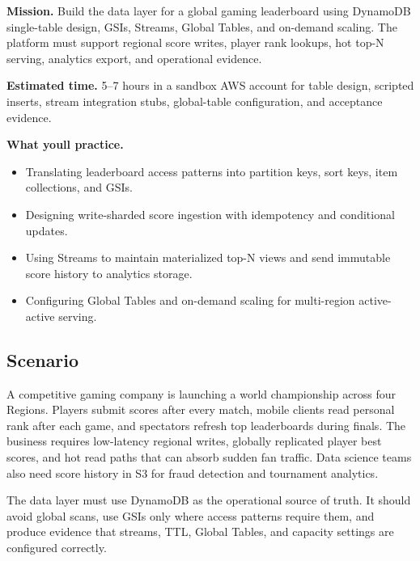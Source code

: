 \begin{capstonebox}
\textbf{Mission.} Build the data layer for a global gaming leaderboard using DynamoDB single-table design, GSIs, Streams, Global Tables, and on-demand scaling. The platform must support regional score writes, player rank lookups, hot top-N serving, analytics export, and operational evidence.

\textbf{Estimated time.} 5--7 hours in a sandbox AWS account for table design, scripted inserts, stream integration stubs, global-table configuration, and acceptance evidence.

\textbf{What you\textquotesingle{}ll practice.}
\begin{itemize}
    \item Translating leaderboard access patterns into partition keys, sort keys, item collections, and GSIs.
    \item Designing write-sharded score ingestion with idempotency and conditional updates.
    \item Using Streams to maintain materialized top-N views and send immutable score history to analytics storage.
    \item Configuring Global Tables and on-demand scaling for multi-region active-active serving.
\end{itemize}
\end{capstonebox}

\subsection*{Scenario}
A competitive gaming company is launching a world championship across four Regions. Players submit scores after every match, mobile clients read personal rank after each game, and spectators refresh top leaderboards during finals. The business requires low-latency regional writes, globally replicated player best scores, and hot read paths that can absorb sudden fan traffic. Data science teams also need score history in S3 for fraud detection and tournament analytics.

The data layer must use DynamoDB as the operational source of truth. It should avoid global scans, use GSIs only where access patterns require them, and produce evidence that streams, TTL, Global Tables, and capacity settings are configured correctly.


